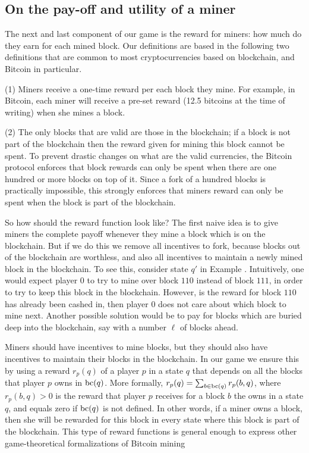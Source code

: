 
\subsection{On the pay-off and utility of a miner}\label{sec-wtf}

The next and last component of our game is the reward for miners: how much do they earn for each mined block. Our definitions are based in the following 
two definitions that are common to most cryptocurrencies based on blockchain, and Bitcoin in particular. 

\noindent
(1) Miners receive a one-time reward per each block they mine. For example, in Bitcoin, each miner will receive a pre-set reward (12.5 bitcoins at the time of writing) when she mines a block.

\noindent
(2) The only blocks that are valid are those in the blockchain; if a block is not part of the blockchain then the reward given for mining this block cannot be spent. To prevent drastic changes on what are the valid currencies, the Bitcoin protocol enforces that block rewards can only be spent when there are one hundred or more blocks on top of it. Since a fork of a hundred blocks is practically impossible, this strongly enforces that miners reward can only be spent when the block is part of the blockchain.  

So how should the reward function look like? The first naive idea is to give miners the complete payoff whenever they mine a block which is on the blockchain. But if we do this we remove all incentives to fork, because blocks out of the blockchain are worthless, and also all incentives to maintain a newly mined block in the blockchain. To see this, consider state $q'$ in Example \label{ex-mining}. Intuitively, one would expect player $0$ to try to mine over block $110$ instead of block $111$, in order to try to keep this block in the blockchain. However, is the reward for block $110$ has already been cashed in, then player $0$ does not care about which block to mine next. Another possible solution would be to pay for blocks which are buried deep into the blockchain, say with a number $\ell$ of blocks ahead. 

Miners should have incentives to mine blocks, but they should also have incentives to maintain their blocks in the blockchain. In our game we 
ensure this by using a reward $r_p(q)$ of a player $p$ in a state $q$ that depends on all the blocks that player $p$ owns in $\text{bc}(q)$. More formally, $r_p(q)= \sum_{b \in \text{bc}(q)} r_p(b,q)$, where $r_p(b,q) > 0$ is the reward that player $p$ receives for a block $b$ the owns in a state $q$, and equals zero if $\text{bc}(q)$ is not defined. 
In other words, if a miner owns a block, then she will be rewarded for this block in every state where this block is part of the blockchain. 
This type of reward functions is general enough to express other game-theoretical formalizations of Bitcoin mining \cite{mininggames:2016}


